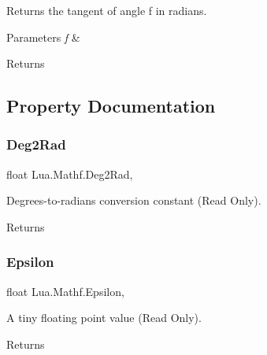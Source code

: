 Returns the tangent of angle f in radians. 


\begin{DoxyParams}{Parameters}
{\em f} & \\
\hline
\end{DoxyParams}
\begin{DoxyReturn}{Returns}

\end{DoxyReturn}


\subsection{Property Documentation}
\mbox{\label{class_lua_1_1_mathf_a5f003a3aab6299095b301066d0af6eab}} 
\subsubsection{\texorpdfstring{Deg2Rad}{Deg2Rad}}
{\footnotesize\ttfamily float Lua.\+Mathf.\+Deg2\+Rad\hspace{0.3cm}{\ttfamily [static]}, {\ttfamily [get]}}



Degrees-\/to-\/radians conversion constant (Read Only). 

\begin{DoxyReturn}{Returns}

\end{DoxyReturn}
\mbox{\label{class_lua_1_1_mathf_a121e67b35c4d96893e79a5be089ebc8a}} 
\subsubsection{\texorpdfstring{Epsilon}{Epsilon}}
{\footnotesize\ttfamily float Lua.\+Mathf.\+Epsilon\hspace{0.3cm}{\ttfamily [static]}, {\ttfamily [get]}}



A tiny floating point value (Read Only). 

\begin{DoxyReturn}{Returns}

\end{DoxyReturn}
\mbox{\label{class_lua_1_1_mathf_ac3686fdccff0df0a6c797af8ba4722b1}} 
